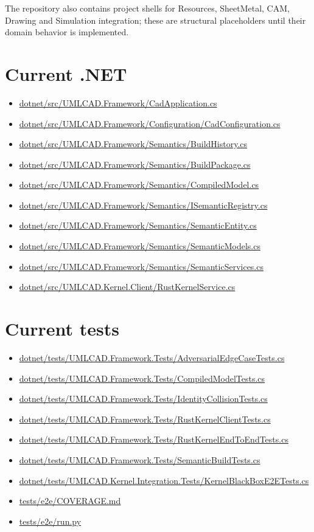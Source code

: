 \documentclass[11pt,a4paper]{report}
\newcommand{\pathref}[1]{\url{#1}}
\begin{document}
The repository also contains project shells for Resources, SheetMetal, CAM, Drawing and Simulation integration; these are structural placeholders until their domain behavior is implemented.

\section{Current .NET}
\begin{itemize}
\item \pathref{dotnet/src/UMLCAD.Framework/CadApplication.cs}
\item \pathref{dotnet/src/UMLCAD.Framework/Configuration/CadConfiguration.cs}
\item \pathref{dotnet/src/UMLCAD.Framework/Semantics/BuildHistory.cs}
\item \pathref{dotnet/src/UMLCAD.Framework/Semantics/BuildPackage.cs}
\item \pathref{dotnet/src/UMLCAD.Framework/Semantics/CompiledModel.cs}
\item \pathref{dotnet/src/UMLCAD.Framework/Semantics/ISemanticRegistry.cs}
\item \pathref{dotnet/src/UMLCAD.Framework/Semantics/SemanticEntity.cs}
\item \pathref{dotnet/src/UMLCAD.Framework/Semantics/SemanticModels.cs}
\item \pathref{dotnet/src/UMLCAD.Framework/Semantics/SemanticServices.cs}
\item \pathref{dotnet/src/UMLCAD.Kernel.Client/RustKernelService.cs}
\end{itemize}

\section{Current tests}
\begin{itemize}
\item \pathref{dotnet/tests/UMLCAD.Framework.Tests/AdversarialEdgeCaseTests.cs}
\item \pathref{dotnet/tests/UMLCAD.Framework.Tests/CompiledModelTests.cs}
\item \pathref{dotnet/tests/UMLCAD.Framework.Tests/IdentityCollisionTests.cs}
\item \pathref{dotnet/tests/UMLCAD.Framework.Tests/RustKernelClientTests.cs}
\item \pathref{dotnet/tests/UMLCAD.Framework.Tests/RustKernelEndToEndTests.cs}
\item \pathref{dotnet/tests/UMLCAD.Framework.Tests/SemanticBuildTests.cs}
\item \pathref{dotnet/tests/UMLCAD.Kernel.Integration.Tests/KernelBlackBoxE2ETests.cs}
\item \pathref{tests/e2e/COVERAGE.md}
\item \pathref{tests/e2e/run.py}
\end{itemize}
\end{document}
